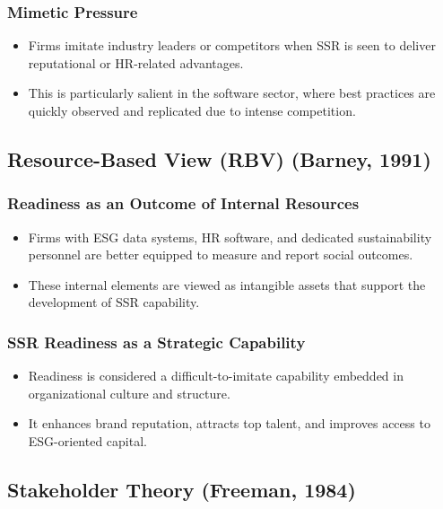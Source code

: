 \subsubsection{Mimetic Pressure}
\begin{itemize}
    \item Firms imitate industry leaders or competitors when SSR is seen to deliver reputational or HR-related advantages. 
    \item This is particularly salient in the software sector, where best practices are quickly observed and replicated due to intense competition.
\end{itemize}

\subsection{Resource-Based View (RBV) (Barney, 1991)}
\subsubsection{Readiness as an Outcome of Internal Resources}
\begin{itemize}
    \item Firms with ESG data systems, HR software, and dedicated sustainability personnel are better equipped to measure and report social outcomes.
    \item These internal elements are viewed as intangible assets that support the development of SSR capability.
\end{itemize}

\subsubsection{SSR Readiness as a Strategic Capability}
\begin{itemize}
    \item Readiness is considered a difficult-to-imitate capability embedded in organizational culture and structure.
    \item It enhances brand reputation, attracts top talent, and improves access to ESG-oriented capital.
\end{itemize}

\subsection{Stakeholder Theory (Freeman, 1984)}

